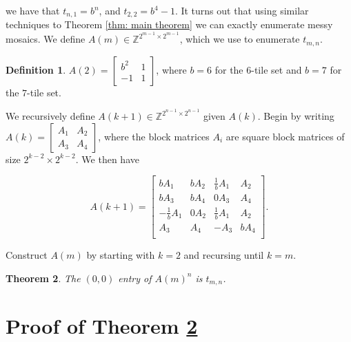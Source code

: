 \documentclass[12pt]{article}
\theoremstyle{plain}
\newtheorem{thm}{Theorem}
\theoremstyle{definition}
\newtheorem{defn}[thm]{Definition}
\theoremstyle{remark}
\theoremstyle{definition}
\newcommand{\cellA}[4]{ \draw[thick] ( #1 , #2 ) rectangle ( #3 , #4 ); \draw[red, thick, densely dotted] (#3 * 0.5 + #1 * 0.5 , #2) -- (#3, #4 * 0.5 + #2 * 0.5);}
\newcommand{\cellB}[4]{ \draw[thick] ( #1 , #2 ) rectangle ( #3 , #4 ); \draw[red, thick, densely dotted] (#3 * 0.5 + #1 * 0.5 , #2) -- (#1, #4 * 0.5 + #2 * 0.5);}
\newcommand{\cellC}[4]{ \draw[thick] ( #1 , #2 ) rectangle ( #3 , #4 ); \draw[red, thick, densely dotted] (#3 * 0.5 + #1 * 0.5 , #4) -- (#1, #4 * 0.5 + #2 * 0.5);}
\newcommand{\cellD}[4]{ \draw[thick] ( #1 , #2 ) rectangle ( #3 , #4 ); \draw[red, thick, densely dotted] (#3 * 0.5 + #1 * 0.5 , #4) -- (#3, #4 * 0.5 + #2 * 0.5);}
\begin{document}
\begin{center}
\end{center}

we have that $t_{n,1}=b^n$, and $t_{2,2} = b^4 - 1$. It turns out that using similar techniques to Theorem \ref{thm: main theorem} we can exactly enumerate messy mosaics. We define $A(m) \in \mathbb{Z}^{2^{m-1} \times 2^{m-1}}$, which we use to enumerate $t_{m,n}$.

\begin{defn}

$A(2) = \begin{bmatrix}
b^2 & 1 \\
-1 & 1
\end{bmatrix}$, where $b = 6$ for the $6$-tile set and $b = 7$ for the $7$-tile set. 

We recursively define $A(k+1) \in \mathbb{Z}^{2^{n-1} \times 2^{n-1}}$ given $A(k)$. Begin by writing
$
A(k) = \begin{bmatrix}
A_1 & A_2 \\
A_3 & A_4
\end{bmatrix}
$, where the block matrices $A_i$ are square block matrices of size $2^{k-2} \times 2^{k-2}$. We then have

$$
A(k+1) = \begin{bmatrix}
    bA_1 & bA_2 & \frac{1}{b}A_1 & A_2 \\
    bA_3 & bA_4 & 0A_3 & A_4 \\
    -\frac{1}{b}A_1 & 0A_2 & \frac{1}{b}A_1 & A_2 \\
    A_3 & A_4 & -A_3 & bA_4 \\
\end{bmatrix}.
$$

Construct $A(m)$ by starting with $k=2$ and recursing until $k=m$. 

\end{defn}

\begin{thm}
\label{thm: messy mosaics}
The $(0,0)$ entry of $A(m)^n$ is $t_{m,n}$.
\end{thm}

\section{Proof of Theorem \ref{thm: messy mosaics}}
\end{document}
